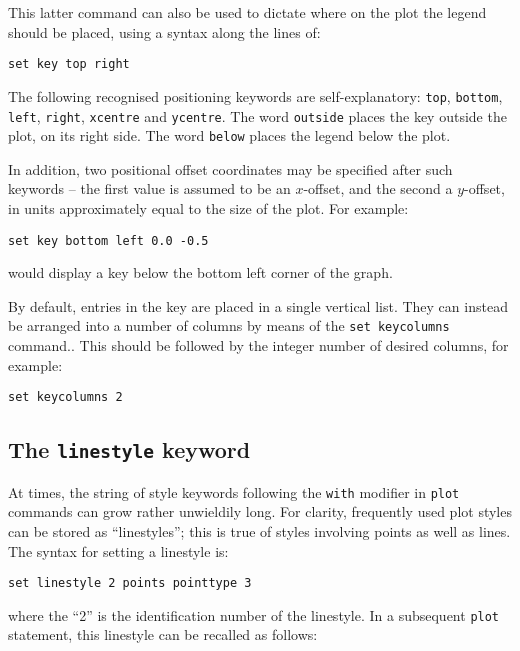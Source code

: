 \documentclass[a4paper,onecolumn,11pt]{book}
\begin{document}
This latter command can also be used to dictate where on the plot the legend
should be placed, using a syntax along the lines of:

\begin{verbatim}
set key top right
\end{verbatim}

The following recognised positioning keywords are self-explanatory:
\texttt{top}, \texttt{bottom}, \texttt{left}, \texttt{right}, \texttt{xcentre}
and \texttt{ycentre}. The word \texttt{outside} places the key outside the
plot, on its right side. The word \texttt{below} places the legend below the
plot.

In addition, two positional offset coordinates may be specified after such
keywords -- the first value is assumed to be an $x$-offset, and the second a
$y$-offset, in units approximately equal to the size of the plot. For example:

\begin{verbatim}
set key bottom left 0.0 -0.5
\end{verbatim}

\noindent would display a key below the bottom left corner of the graph.

By default, entries in the key are placed in a single vertical list. They can
instead be arranged into a number of columns by means of the \texttt{set
keycolumns} command.. This should be followed by the integer number of desired columns, for
example:

\begin{verbatim}
set keycolumns 2
\end{verbatim}

\subsection{The \texttt{linestyle} keyword}

At times, the string of style keywords following the \texttt{with} modifier in
\texttt{plot} commands can grow rather unwieldily long. For clarity, frequently
used plot styles can be stored as ``linestyles''; this is true of styles
involving points as well as lines. The syntax for setting a linestyle is:

\begin{verbatim}
set linestyle 2 points pointtype 3
\end{verbatim}

\noindent where the ``2'' is the identification number of the linestyle. In a
subsequent \texttt{plot} statement, this linestyle can be recalled as follows:
\end{document}
